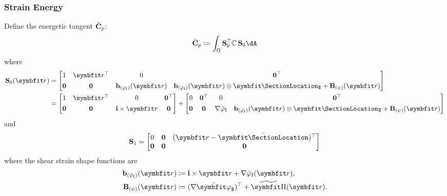 \subsubsection{Strain Energy}
Define the energetic tangent \(\bar{\mathbf{C}}_p\):
\begin{equation}
\IesanEnergy \coloneq \int_\Section \mathbf{S}_0^\top \mathbb{C}\, \mathbf{S}_0\dA
\label{eq:def-iesan-energy}
\end{equation}
where
\begin{equation*}
\begin{aligned}
\mathbf{S}_0(\bm{r}) &= \begin{bmatrix}
1 & \bm{r}^\top & 0 & \mathbf{0}^\top \\[4pt]
\mathbf{0} & \mathbf{0} & \mathbf{b}_{(\WarpTwistIesan)}(\bm{r}) & 
\mathbf{b}_{(\WarpTwistIesan)}(\bm{r}) \otimes \CenterShearLocation + \mathbf{B}_{(\WarpShearIesan)}(\bm{r})
\end{bmatrix} \\
&= \begin{bmatrix}
1 & \bm{r}^\top & 0 & \mathbf{0}^\top \\[4pt]
\mathbf{0} & \mathbf{0} & \FrameBasis\times\bm{r} & 
\mathbf{0} %
\end{bmatrix} 
+\begin{bmatrix}
0 & \mathbf{0}^\top & 0 & \mathbf{0}^\top \\[4pt]
\mathbf{0} & \mathbf{0} & \nabla\WarpTwistIesan & 
\mathbf{b}_{(\WarpTwistIesan)}(\bm{r}) \otimes \CenterShearLocation + \mathbf{B}_{(\WarpShearIesan)}(\bm{r})
\end{bmatrix}
\end{aligned}
\end{equation*}
and
\begin{equation*}
\mathbf{S}_1 = \begin{bmatrix}
    0 & \mathbf{0} & (\bm{r} - \CentroidLocation)^\top \\ 
    \mathbf{0} & \mathbf{0} & \mathbf{0}
\end{bmatrix}
\end{equation*}
where the shear strain shape functions are
\begin{subequations}
\begin{align}
\mathbf{b}_{(\WarpTwistIesan)}(\bm{r}) &\coloneq \FrameBasis \times \bm{r} + \nabla\WarpTwistIesan(\bm{r}), 
\label{eq:tau-phi} \\
\mathbf{B}_{(\WarpShearIesan)}(\bm{r}) &\coloneq (\nabla\WarpShearShape{})^{\top} + \PlaneShearShape(\bm{r}).
\label{eq:tau-psi}
\end{align}
\end{subequations}

